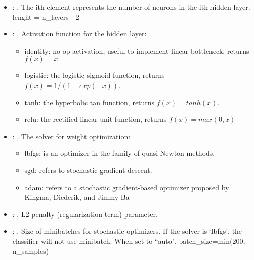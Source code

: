 \begin{itemize}
    \item {}: , 
      The ith element represents the number of neurons in the ith hidden layer.
      lenght = n\_layers - 2

    \item {}: , 
      Activation function for the hidden layer:
      \begin{itemize}                                                   \item identity:  no-op
      activation, useful to implement linear bottleneck, returns $f(x) = x$
      \item logistic: the logistic sigmoid function, returns $f(x) = 1 / (1 + exp(-x))$.
      \item tanh: the hyperbolic tan function, returns $f(x) = tanh(x)$.
      \item relu:  the rectified linear unit function, returns $f(x) = max(0, x)$
      \end{itemize}

    \item {}: , 
      The solver for weight optimization:
      \begin{itemize}                                                   \item lbfgs: is an optimizer
      in the family of quasi-Newton methods.                                                   \item
      sgd: refers to stochastic gradient descent.
      \item adam: refers to a stochastic gradient-based optimizer proposed by Kingma, Diederik, and
      Jimmy Ba                                                  \end{itemize}

    \item {}: , 
      L2 penalty (regularization term) parameter.

    \item {}: , 
      Size of minibatches for stochastic optimizers. If the solver is `lbfgs',
      the classifier will not use minibatch. When set to ``auto", batch\_size=min(200, n\_samples)


\end{itemize}
